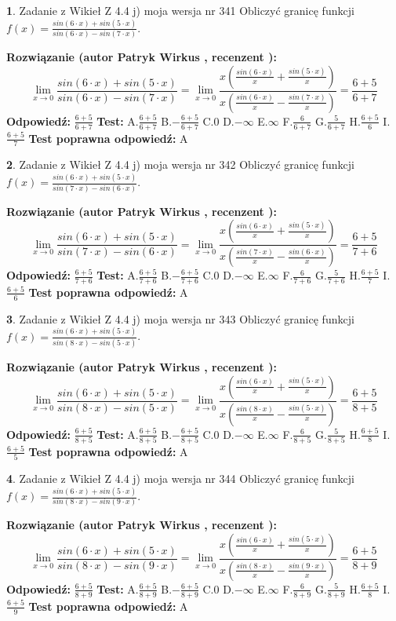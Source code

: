 \documentclass[12pt, a4paper]{article}
\theoremstyle{definition} %
\newtheorem{zad}{}
\newcommand{\zadStart}[1]{\begin{zad}#1\newline}
\newcommand{\zadStop}{\end{zad}}
\newcommand{\rozwStart}[2]{\noindent \textbf{Rozwiązanie (autor #1 , recenzent #2): }\newline}
\newcommand{\rozwStop}{\newline}
\newcommand{\odpStart}{\noindent \textbf{Odpowiedź:}\newline}
\newcommand{\odpStop}{\newline}
\newcommand{\testStart}{\noindent \textbf{Test:}\newline}
\newcommand{\testStop}{\newline}
\newcommand{\kluczStart}{\noindent \textbf{Test poprawna odpowiedź:}\newline}
\newcommand{\kluczStop}{\newline}
\begin{document}
\zadStart{Zadanie z Wikieł Z 4.4 j) moja wersja nr 341}
Obliczyć granicę funkcji $f(x)=\frac{sin(6\cdot x) +sin(5\cdot x)}{sin(6\cdot x) -sin(7\cdot x)}$.
\zadStop
\rozwStart{Patryk Wirkus}{}
$$\lim\limits_{x\to 0}\frac{sin(6\cdot x) +sin(5\cdot x)}{sin(6\cdot x) -sin(7\cdot x)}=\lim\limits_{x\to 0}\frac{x(\frac{sin(6\cdot x)}{x}+\frac{sin(5\cdot x)}{x})}{x(\frac{sin(6\cdot x)}{x}-\frac{sin(7\cdot x)}{x})}=\frac{6+5}{6+7}$$
\rozwStop
\odpStart
$\frac{6+5}{6+7}$
\odpStop
\testStart
A.$\frac{6+5}{6+7}$
B.$-\frac{6+5}{6+7}$
C.$0$
D.$-\infty$
E.$\infty$
F.$\frac{6}{6+7}$
G.$\frac{5}{6+7}$
H.$\frac{6+5}{6}$
I.$\frac{6+5}{7}$
\testStop
\kluczStart
A
\kluczStop



\zadStart{Zadanie z Wikieł Z 4.4 j) moja wersja nr 342}
Obliczyć granicę funkcji $f(x)=\frac{sin(6\cdot x) +sin(5\cdot x)}{sin(7\cdot x) -sin(6\cdot x)}$.
\zadStop
\rozwStart{Patryk Wirkus}{}
$$\lim\limits_{x\to 0}\frac{sin(6\cdot x) +sin(5\cdot x)}{sin(7\cdot x) -sin(6\cdot x)}=\lim\limits_{x\to 0}\frac{x(\frac{sin(6\cdot x)}{x}+\frac{sin(5\cdot x)}{x})}{x(\frac{sin(7\cdot x)}{x}-\frac{sin(6\cdot x)}{x})}=\frac{6+5}{7+6}$$
\rozwStop
\odpStart
$\frac{6+5}{7+6}$
\odpStop
\testStart
A.$\frac{6+5}{7+6}$
B.$-\frac{6+5}{7+6}$
C.$0$
D.$-\infty$
E.$\infty$
F.$\frac{6}{7+6}$
G.$\frac{5}{7+6}$
H.$\frac{6+5}{7}$
I.$\frac{6+5}{6}$
\testStop
\kluczStart
A
\kluczStop



\zadStart{Zadanie z Wikieł Z 4.4 j) moja wersja nr 343}
Obliczyć granicę funkcji $f(x)=\frac{sin(6\cdot x) +sin(5\cdot x)}{sin(8\cdot x) -sin(5\cdot x)}$.
\zadStop
\rozwStart{Patryk Wirkus}{}
$$\lim\limits_{x\to 0}\frac{sin(6\cdot x) +sin(5\cdot x)}{sin(8\cdot x) -sin(5\cdot x)}=\lim\limits_{x\to 0}\frac{x(\frac{sin(6\cdot x)}{x}+\frac{sin(5\cdot x)}{x})}{x(\frac{sin(8\cdot x)}{x}-\frac{sin(5\cdot x)}{x})}=\frac{6+5}{8+5}$$
\rozwStop
\odpStart
$\frac{6+5}{8+5}$
\odpStop
\testStart
A.$\frac{6+5}{8+5}$
B.$-\frac{6+5}{8+5}$
C.$0$
D.$-\infty$
E.$\infty$
F.$\frac{6}{8+5}$
G.$\frac{5}{8+5}$
H.$\frac{6+5}{8}$
I.$\frac{6+5}{5}$
\testStop
\kluczStart
A
\kluczStop



\zadStart{Zadanie z Wikieł Z 4.4 j) moja wersja nr 344}
Obliczyć granicę funkcji $f(x)=\frac{sin(6\cdot x) +sin(5\cdot x)}{sin(8\cdot x) -sin(9\cdot x)}$.
\zadStop
\rozwStart{Patryk Wirkus}{}
$$\lim\limits_{x\to 0}\frac{sin(6\cdot x) +sin(5\cdot x)}{sin(8\cdot x) -sin(9\cdot x)}=\lim\limits_{x\to 0}\frac{x(\frac{sin(6\cdot x)}{x}+\frac{sin(5\cdot x)}{x})}{x(\frac{sin(8\cdot x)}{x}-\frac{sin(9\cdot x)}{x})}=\frac{6+5}{8+9}$$
\rozwStop
\odpStart
$\frac{6+5}{8+9}$
\odpStop
\testStart
A.$\frac{6+5}{8+9}$
B.$-\frac{6+5}{8+9}$
C.$0$
D.$-\infty$
E.$\infty$
F.$\frac{6}{8+9}$
G.$\frac{5}{8+9}$
H.$\frac{6+5}{8}$
I.$\frac{6+5}{9}$
\testStop
\kluczStart
A
\kluczStop
\end{document}
